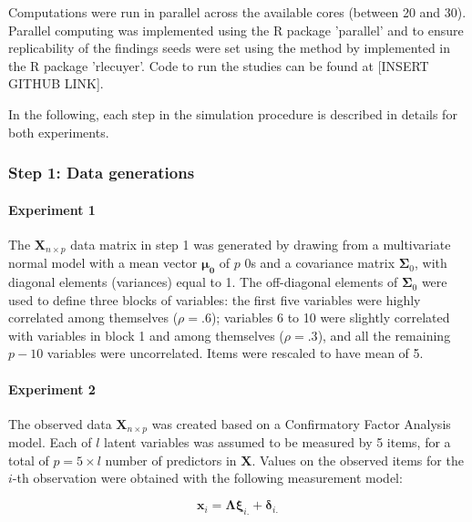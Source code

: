 	Computations were run in parallel across the available cores (between 20 and 30). Parallel computing 
	was implemented using the R package 'parallel' and to ensure replicability of the findings seeds were
	set using the method by \cite{lecuyer:2002} implemented in the R package 'rlecuyer'.
	Code to run the studies can be found at [INSERT GITHUB LINK].

	In the following, each step in the simulation procedure is described in details for both experiments.


\subsubsection{Step 1: Data generations}

	\paragraph{Experiment 1} 
	The $\bm{X}_{n \times p}$ data matrix in step 1 was generated by drawing from a multivariate normal 
	model with a mean vector $\bm{\mu_0}$ of $p$ 0s and a covariance matrix $\bm{\Sigma}_0$, with diagonal 
	elements (variances) equal to 1. 
	The off-diagonal elements of $\bm{\Sigma}_0$ were used to define three blocks of variables: 
	the first five variables were highly correlated among themselves ($\rho = .6$); 
	variables 6 to 10 were slightly correlated with variables in block 1 and among themselves ($\rho = .3$), 
	and all the remaining $p-10$ variables were uncorrelated.
	Items were rescaled to have mean of 5.

	\paragraph{Experiment 2}
	The observed data $\bm{X}_{n \times p}$ was created based on a Confirmatory Factor Analysis model.
	Each of $l$ latent variables was assumed to be measured by 5 items, for a total of $p = 5 \times l$ 
	number of predictors in $\bm{X}$.
	Values on the observed items for the $i$-th observation were obtained with the following measurement 
	model:

	\begin{equation}
		\bm{x}_i = \bm{\Lambda} \bm{\xi}_{i.} + \bm{\delta}_{i.}
	\end{equation}

